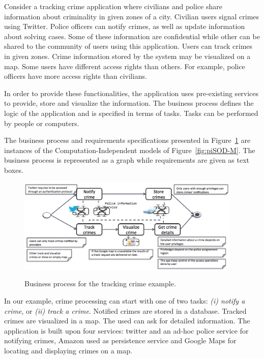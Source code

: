 
Consider a tracking crime application where civilians and police share information about criminality in given zones of a city. 
Civilian users signal crimes using Twitter.
Police officers can notify crimes, as well as update information about solving cases.
Some of these information are confidential while other can be shared
to the community of users using this application. 
Users can track crimes in given zones. 
Crime information stored by the system may be visualized on a map. 
Some users have different access rights than others.
For example, police officers have more access rights than civilians.


In order to provide these functionalities, the application uses pre-existing services to provide, store and visualize the information.
The business process defines the logic of the application and is specified in terms of tasks. 
Tasks can be performed by people or computers. 

The business process and requirements specifications presented in Figure~\ref{fig:constraints} are instances of the Computation-Independent models of Figure~\ref{fig:piSOD-M}.
The business process is represented as a graph while requirements are given as text boxes.
\begin{figure}[ht!]
\centering
{\label{fig:trans06}\includegraphics[width=0.95\textwidth]{figs/constraints}}
~ %
\caption{Business process for the tracking crime example.}
\label{fig:constraints}
\end{figure}

In our example, crime processing can start with one of two tasks: \textit{(i) notify a crime}, or \textit{(ii) track a crime}.
Notified crimes are stored in a database. 
Tracked crimes are visualized in a map.
The used can ask for detailed information. 
The application is built upon four services: \textsf{twitter} and an \textsf{ad-hoc police service} for notifying crimes, \textsf{Amazon} used as  persistence service and  \textsf{Google Maps} for locating and displaying crimes on a map.

